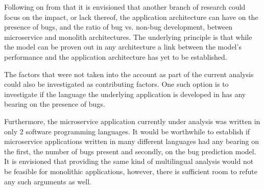 Following on from that it is envisioned that another branch of research could focus on the impact, or lack thereof, the application architecture can have on the presence of bugs, and the ratio of bug vs. non-bug development, between microservice and monolith architectures. The underlying principle is that while the model can be proven out in any architecture a link between the model's performance and the application architecture has yet to be established.

The factors that were not taken into the account as part of the current analysis could also be investigated as contributing factors. One such option is to investigate if the language the underlying application is developed in has any bearing on the presence of bugs. 

Furthermore, the microservice application currently under analysis was written in only 2 software programming languages. It would be worthwhile to establish if microservice applications written in many different languages had any bearing on the first, the number of bugs present and secondly, on the bug prediction model. It is envisioned that providing the same kind of multilingual analysis would not be  feasible for monolithic applications, however, there is sufficient room to refute any such arguments as well.
